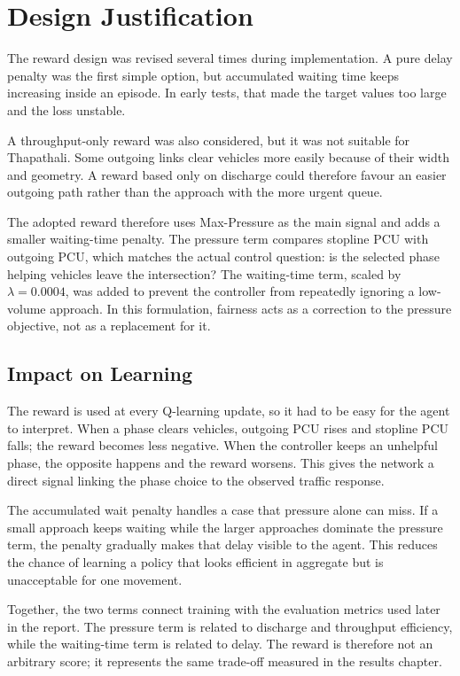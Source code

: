 \section{Design Justification}
\label{sec:design_justification}

The reward design was revised several times during implementation. A pure
delay penalty was the first simple option, but accumulated waiting time
keeps increasing inside an episode. In early tests, that made the target
values too large and the loss unstable.

A throughput-only reward was also considered, but it was not suitable for
Thapathali. Some outgoing links clear vehicles more easily because of
their width and geometry. A reward based only on discharge could
therefore favour an easier outgoing path rather than the approach with
the more urgent queue.

The adopted reward therefore uses Max-Pressure as the main signal and
adds a smaller waiting-time penalty. The pressure term compares stopline
PCU with outgoing PCU, which matches the actual control question: is the
selected phase helping vehicles leave the intersection? The waiting-time
term, scaled by $\lambda = 0.0004$, was added to prevent the controller
from repeatedly ignoring a low-volume approach. In this formulation,
fairness acts as a correction to the pressure objective, not as a
replacement for it.

\subsection{Impact on Learning}
\label{subsec:impact_on_learning}

The reward is used at every Q-learning update, so it had to be easy for
the agent to interpret. When a phase clears vehicles, outgoing PCU rises
and stopline PCU falls; the reward becomes less negative. When the
controller keeps an unhelpful phase, the opposite happens and the reward
worsens. This gives the network a direct signal linking the phase choice
to the observed traffic response.

The accumulated wait penalty handles a case that pressure alone can miss.
If a small approach keeps waiting while the larger approaches dominate
the pressure term, the penalty gradually makes that delay visible to the
agent. This reduces the chance of learning a policy that looks efficient
in aggregate but is unacceptable for one movement.

Together, the two terms connect training with the evaluation metrics used
later in the report. The pressure term is related to discharge and
throughput efficiency, while the waiting-time term is related to delay.
The reward is therefore not an arbitrary score; it represents the same
trade-off measured in the results chapter.

